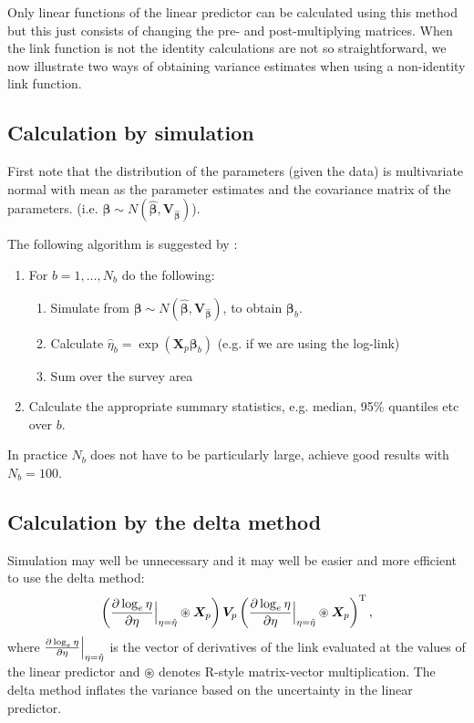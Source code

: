 \documentclass[11pt]{amsart}
\begin{document}
Only linear functions of the linear predictor can be calculated using this method but this just consists of changing the pre- and post-multiplying matrices. When the link function is not the identity calculations are not so straightforward, we now illustrate two ways of obtaining variance estimates when using a non-identity link function.

\subsection{Calculation by simulation}

First note that the distribution of the parameters (given the data) is multivariate normal with mean as the parameter estimates and the covariance matrix of the parameters. (i.e. $\bm{\beta} \sim N(\hat{\bm{\beta}}, \bm{V_{\hat{\beta}}})$). 

The following algorithm is suggested by \citep[][page 246]{Wood:2006wz}:
\begin{enumerate}
	\item For $b=1, \ldots, N_b$ do the following:
	\begin{enumerate}
    		\item Simulate from $\bm{\beta} \sim N(\hat{\bm{\beta}}, \bm{V_{\hat{\beta}}})$, to obtain $\bm{\beta}_b$.
		\item Calculate $\hat{\eta}_b = \exp(\bm{X}_{p} \bm{\beta}_b)$ (e.g. if we are using the log-link)
		\item Sum over the survey area
	\end{enumerate}
	\item  Calculate the appropriate summary statistics, e.g. median, 95\% quantiles etc over $b$.
\end{enumerate}

In practice $N_b$ does not have to be particularly large, \cite{Marra:2011eq} achieve good results with $N_b=100$.

\subsection{Calculation by the delta method}

Simulation may well be unnecessary and it may well be easier and more efficient to use the delta method:
$$
\left(\frac{\partial \log_e \eta}{\partial \eta} \Big{\vert}_{\eta=\hat{\eta}} \circledast \bm{X}_{p} \right) \bm{V}_{p} \left( \frac{\partial \log_e \eta}{\partial \eta} \Big{\vert}_{\eta=\hat{\eta}} \circledast \bm{X}_{p} \right)^\text{T},
$$
where $\frac{\partial \log_e \eta}{\partial \eta} \Big{\vert}_{\eta=\hat{\eta}}$ is the vector of derivatives of the link evaluated at the values of the linear predictor and $\circledast$ denotes \textsf{R}-style matrix-vector multiplication. The delta method inflates the variance based on the uncertainty in the linear predictor.




\end{document}
